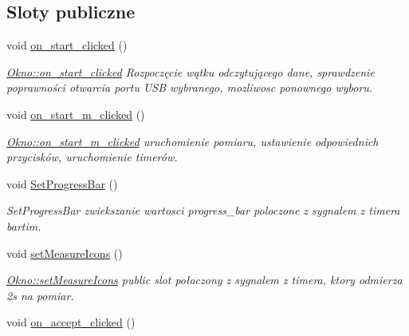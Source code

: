 \subsection*{Sloty publiczne}
\begin{DoxyCompactItemize}
\item 
void \hyperlink{class_okno_ad6a171a82ec052ba0e8c721ffac0e870}{on\+\_\+start\+\_\+clicked} ()\hypertarget{class_okno_ad6a171a82ec052ba0e8c721ffac0e870}{}\label{class_okno_ad6a171a82ec052ba0e8c721ffac0e870}

\begin{DoxyCompactList}\small\item\em \hyperlink{class_okno_ad6a171a82ec052ba0e8c721ffac0e870}{Okno\+::on\+\_\+start\+\_\+clicked} Rozpoczęcie wątku odczytującego dane, sprawdzenie poprawności otwarcia portu U\+SB wybranego, mozliwosc ponownego wyboru. \end{DoxyCompactList}\item 
void \hyperlink{class_okno_ad3e545f9470f154d09ab9cf91bee0b2a}{on\+\_\+start\+\_\+m\+\_\+clicked} ()\hypertarget{class_okno_ad3e545f9470f154d09ab9cf91bee0b2a}{}\label{class_okno_ad3e545f9470f154d09ab9cf91bee0b2a}

\begin{DoxyCompactList}\small\item\em \hyperlink{class_okno_ad3e545f9470f154d09ab9cf91bee0b2a}{Okno\+::on\+\_\+start\+\_\+m\+\_\+clicked} uruchomienie pomiaru, ustawienie odpowiednich przycisków, uruchomienie timerów. \end{DoxyCompactList}\item 
void \hyperlink{class_okno_ae30bfa2ba063af6dac4680291bccb6cd}{Set\+Progress\+Bar} ()\hypertarget{class_okno_ae30bfa2ba063af6dac4680291bccb6cd}{}\label{class_okno_ae30bfa2ba063af6dac4680291bccb6cd}

\begin{DoxyCompactList}\small\item\em Set\+Progress\+Bar zwiekszanie wartosci progress\+\_\+bar poloczone z sygnalem z timera bartim. \end{DoxyCompactList}\item 
void \hyperlink{class_okno_aaf9c12bca53a881c5492cd7779cdecad}{set\+Measure\+Icons} ()\hypertarget{class_okno_aaf9c12bca53a881c5492cd7779cdecad}{}\label{class_okno_aaf9c12bca53a881c5492cd7779cdecad}

\begin{DoxyCompactList}\small\item\em \hyperlink{class_okno_aaf9c12bca53a881c5492cd7779cdecad}{Okno\+::set\+Measure\+Icons} public slot połaczony z sygnalem z timera, ktory odmierza 2s na pomiar. \end{DoxyCompactList}\item 
void \hyperlink{class_okno_a6fea95038d5967dd336b87935b97170c}{on\+\_\+accept\+\_\+clicked} ()\hypertarget{class_okno_a6fea95038d5967dd336b87935b97170c}{}\label{class_okno_a6fea95038d5967dd336b87935b97170c}


\end{DoxyCompactItemize}
